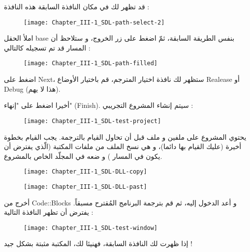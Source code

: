 قد تظهر لك في مكان النافذة السابقة هذه النافذة :

\begin{figure}[H]
	\centering
	\texttt{[image: Chapter\_III-1\_SDL-path-select-2]}
\end{figure}

املأ الحقل
\textenglish{base}
بنفس الطريقة السابقة، ثمّ اضغط على زر الخروج، و ستلاحظ أن المسار قد تم تسجيله كالتالي :

\begin{figure}[H]
	\centering
	\texttt{[image: Chapter\_III-1\_SDL-path-filled]}
\end{figure}

اضغط على
\textenglish{Next}،
 ستظهر لك نافذة اختيار المترجم، قم باختيار الأوضاع
\textenglish{Realease}
أو
\textenglish{Debug}
(هذا لا يهم).

أخيرا اضغط على "إنهاء"
(\textenglish{Finish}).
 سيتم إنشاء المشروع التجريبي :
 
 \begin{figure}[H]
 	\centering
 	\texttt{[image: Chapter\_III-1\_SDL-test-project]}
 \end{figure}


يحتوي المشروع على ملفين 
و ملف
قبل أن تحاول القيام بالترجمة. يجب القيام بخطوة أخيرة (عليك القيام بها دائما)، و هي نسخ الملف 
من ملفات المكتبة (الّذي يفترض أن يكون في المسار 
)
و ضعه في المجلّد الخاص بالمشروع.

 \begin{figure}[H]
	\centering
	\texttt{[image: Chapter\_III-1\_SDL-DLL-copy]}
\end{figure}
 \begin{figure}[H]
	\centering
	\texttt{[image: Chapter\_III-1\_SDL-DLL-past]}
\end{figure}

أخرج من 
\textenglish{Code::Blocks}
و أعد الدخول إليه، ثم قم بترجمة البرنامج المُقترح مسبقاً. يفترض أن تظهر النافذة التالية :

 \begin{figure}[H]
	\centering
	\texttt{[image: Chapter\_III-1\_SDL-test-window]}
\end{figure}


إذا ظهرت لك النافذة السابقة، فهنيئا لك، المكتبة مثبتة بشكل جيد !

